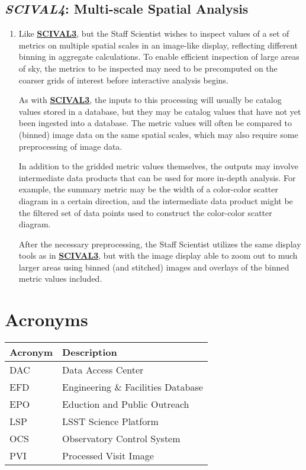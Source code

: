 \documentclass[DM,toc,lsstdraft]{lsstdoc}
\newcommand{\usecase}[3]{%
\subsection{\emph{#1}: #2}
\label{use:#1}
\begin{enumerate}[label=\alph*.]
#3
\end{enumerate}
}
\newcommand{\useref}[1]{\hyperref[use:#1]{\textcolor{lsstblue}{\textbf{#1}}}}
\begin{document}
\usecase{SCIVAL4}{Multi-scale Spatial Analysis}{%

\item
Like \useref{SCIVAL3}, but the Staff Scientist wishes to inspect values of a set of metrics on multiple spatial scales in an image-like display, reflecting different binning in aggregate calculations.
To enable efficient inspection of large areas of sky, the metrics to be inspected may need to be precomputed on the coarser grids of interest before interactive analysis begins.

As with \useref{SCIVAL3}, the inputs to this processing will usually be catalog values stored in a database, but they may be catalog values that have not yet been ingested into a database.
The metric values will often be compared to (binned) image data on the same spatial scales, which may also require some preprocessing of image data.

In addition to the gridded metric values themselves, the outputs may involve intermediate data products that can be used for more in-depth analysis.
For example, the summary metric may be the width of a color-color scatter diagram in a certain direction, and the intermediate data product might be the filtered set of data points used to construct the color-color scatter diagram.

After the necessary preprocessing, the Staff Scientist utilizes the same display tools as in \useref{SCIVAL3}, but with the image display able to zoom out to much larger areas using binned (and stitched) images and overlays of the binned metric values included.

}



\section{Acronyms}

\begin{longtable}{|l|p{}|}\hline
\textbf{Acronym} & \textbf{Description}  \\\hline

DAC & Data Access Center\\\hline
EFD & Engineering \& Facilities Database\\\hline
EPO & Eduction and Public Outreach\\\hline
LSP & LSST Science Platform\\\hline
OCS & Observatory Control System\\\hline
PVI & Processed Visit Image \\\hline

\end{longtable}
\end{document}
